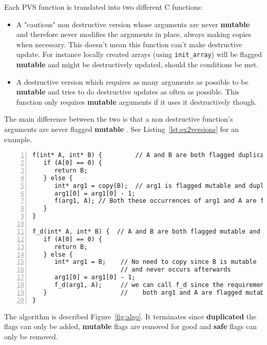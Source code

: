 \documentclass[12pt,a4paper]{article}
\newcommand{\cl}[1]{\texttt{#1}}
\newcommand{\bang}{\textbf{mutable }}
\newcommand{\safe}{\textbf{safe }}
\newcommand{\dupl}{\textbf{duplicated }}
\begin{document}
Each PVS function is translated into two different C functions:
\begin{itemize}
\item A "cautious" non destructive version whose arguments are never \bang and therefore never modifies the arguments in place, always making copies when necessary. This doesn't mean this function can't make destructive update. For instance locally created arrays (using \cl{init\_array}) will be flagged \bang and might be destructively updated, should the conditions be met.
\item A destructive version which requires as many arguments as possible to be \bang and tries to do destructive updates as often as possible. This function only requires \bang arguments if it uses it destructively though.
\end{itemize}
The main difference between the two is that a non destructive function's arguments are never flagged \bang. See Listing~\ref{lst:ex2versions} for an example.



\begin{lstlisting}[numbers=left,caption={Example of the two different versions of a C function generated (stripped from GC instructions)}, label={lst:ex2versions}]
f(int* A, int* B) {         // A and B are both flagged duplicated
   if (A[0] == 0) {
      return B;
   } else {
      int* arg1 = copy(B);  // arg1 is flagged mutable and duplicated
      arg1[0] = arg1[0] - 1;
      f(arg1, A); // Both these occurrences of arg1 and A are flagged safe
   }
}

f_d(int* A, int* B) {  // A and B are both flagged mutable and duplicated
   if (A[0] == 0) {
      return B;
   } else {
      int* arg1 = B;    // No need to copy since B is mutable
                        // and never occurs afterwards
      arg1[0] = arg1[0] - 1;
      f_d(arg1, A);     // we can call f_d since the requirements are met:
   }                    //    both arg1 and A are flagged mutable
}
\end{lstlisting}

The algorithm is described Figure~\ref{fig:algo}. It terminates since \dupl the flags can only be added, \bang flags are removed for good and \safe flags can only be removed.
\end{document}
